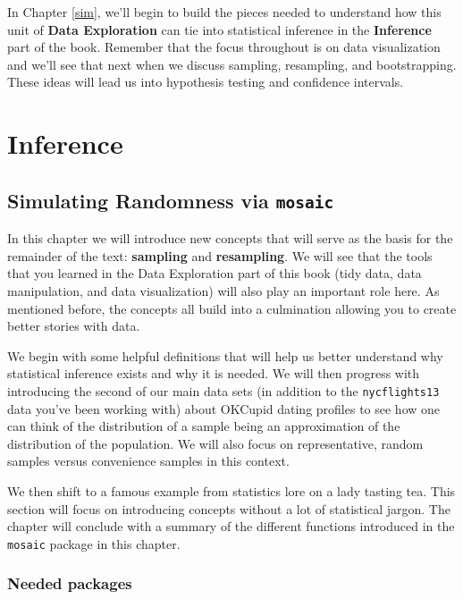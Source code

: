 \documentclass[]{tufte-book}
\begin{document}
In Chapter \ref{sim}, we'll begin to build the pieces needed to
understand how this unit of \textbf{Data Exploration} can tie into
statistical inference in the \textbf{Inference} part of the book.
Remember that the focus throughout is on data visualization and we'll
see that next when we discuss sampling, resampling, and bootstrapping.
These ideas will lead us into hypothesis testing and confidence
intervals.

\part{Inference}\label{part-inference}

\chapter{\texorpdfstring{Simulating Randomness via
\texttt{mosaic}}{Simulating Randomness via mosaic}}\label{simulating-randomness-via-mosaic}

In this chapter we will introduce new concepts that will serve as the
basis for the remainder of the text: \textbf{sampling} and
\textbf{resampling}. We will see that the tools that you learned in the
Data Exploration part of this book (tidy data, data manipulation, and
data visualization) will also play an important role here. As mentioned
before, the concepts all build into a culmination allowing you to create
better stories with data.

We begin with some helpful definitions that will help us better
understand why statistical inference exists and why it is needed. We
will then progress with introducing the second of our main data sets (in
addition to the \texttt{nycflights13} data you've been working with)
about OKCupid dating profiles to see how one can think of the
distribution of a sample being an approximation of the distribution of
the population. We will also focus on representative, random samples
versus convenience samples in this context.

We then shift to a famous example from statistics lore on a lady tasting
tea. This section will focus on introducing concepts without a lot of
statistical jargon. The chapter will conclude with a summary of the
different functions introduced in the \texttt{mosaic} package in this
chapter.

\section*{Needed packages}\label{needed-packages-2}
\end{document}
